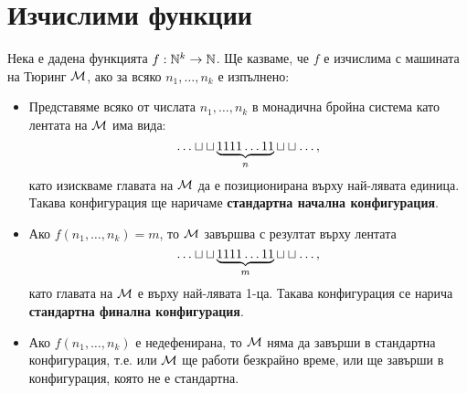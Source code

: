\section{Изчислими функции}

Нека е дадена функцията $f:\mathbb{N}^k \to \mathbb{N}$.
Ще казваме, че $f$ е изчислима с машината на Тюринг $\mathcal{M}$,
ако за всяко $n_1,\dots,n_k$ е изпълнено:
\begin{itemize}
\item 
  Представяме всяко от числата $n_1,\dots,n_k$ в монадична бройна система
  като лентата на $\mathcal{M}$ има вида:  
  \[\dots \blank \blank \underbrace{1111\dots 11}_{n} \blank\blank\dots,\]
  като изискваме главата на $\mathcal{M}$ да е позиционирана върху най-лявата единица.
  Такава конфигурация ще наричаме {\bf стандартна начална конфигурация}.
\item
  Ако $f(n_1,\dots,n_k) = m$, то $\mathcal{M}$ завършва с резултат върху лентата
  \[\dots \blank \blank \underbrace{1111\dots 11}_{m} \blank\blank\dots,\]
  като главата на $\mathcal{M}$ е върху най-лявата 1-ца.
  Такава конфигурация се нарича {\bf стандартна финална конфигурация}.
\item
  Ако $f(n_1,\dots,n_k)$ е недефенирана, то $\mathcal{M}$ няма да завърши в стандартна конфигурация, т.е.
  или $\mathcal{M}$ ще работи безкрайно време, или ще завърши в конфигурация, която не е стандартна.
\end{itemize}

